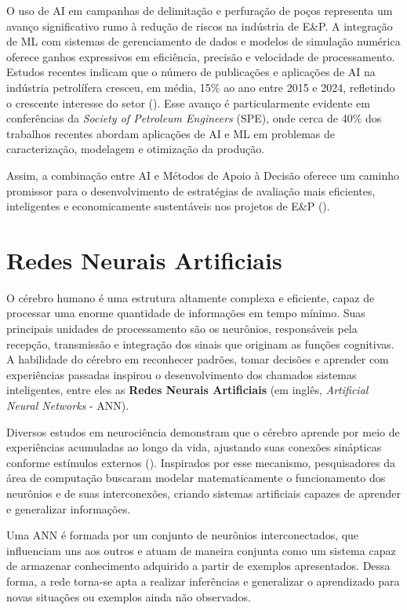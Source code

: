 O uso de AI em campanhas de delimitação e perfuração de poços representa um avanço significativo rumo à redução de riscos na indústria de E\&P. A integração de ML com sistemas de gerenciamento de dados e modelos de simulação numérica oferece ganhos expressivos em eficiência, precisão e velocidade de processamento. Estudos recentes indicam que o número de publicações e aplicações de AI na indústria petrolífera cresceu, em média, 15\% ao ano entre 2015 e 2024, refletindo o crescente interesse do setor (\cite{34}). Esse avanço é particularmente evidente em conferências da \textit{Society of Petroleum Engineers} (SPE), onde cerca de 40\% dos trabalhos recentes abordam aplicações de AI e ML em problemas de caracterização, modelagem e otimização da produção.

Assim, a combinação entre AI e Métodos de Apoio à Decisão oferece um caminho promissor para o desenvolvimento de estratégias de avaliação mais eficientes, inteligentes e economicamente sustentáveis nos projetos de E\&P (\cite{35}).


\section{Redes Neurais Artificiais}

O cérebro humano é uma estrutura altamente complexa e eficiente, capaz de processar uma enorme quantidade de informações em tempo mínimo. Suas principais unidades de processamento são os neurônios, responsáveis pela recepção, transmissão e integração dos sinais que originam as funções cognitivas. A habilidade do cérebro em reconhecer padrões, tomar decisões e aprender com experiências passadas inspirou o desenvolvimento dos chamados sistemas inteligentes, entre eles as \textbf{Redes Neurais Artificiais} (em inglês, \textit{Artificial Neural Networks} - ANN).

Diversos estudos em neurociência demonstram que o cérebro aprende por meio de experiências acumuladas ao longo da vida, ajustando suas conexões sinápticas conforme estímulos externos (\cite{30}). Inspirados por esse mecanismo, pesquisadores da área de computação buscaram modelar matematicamente o funcionamento dos neurônios e de suas interconexões, criando sistemas artificiais capazes de aprender e generalizar informações.

Uma ANN é formada por um conjunto de neurônios interconectados, que influenciam uns aos outros e atuam de maneira conjunta como um sistema capaz de armazenar conhecimento adquirido a partir de exemplos apresentados. Dessa forma, a rede torna-se apta a realizar inferências e generalizar o aprendizado para novas situações ou exemplos ainda não observados.

